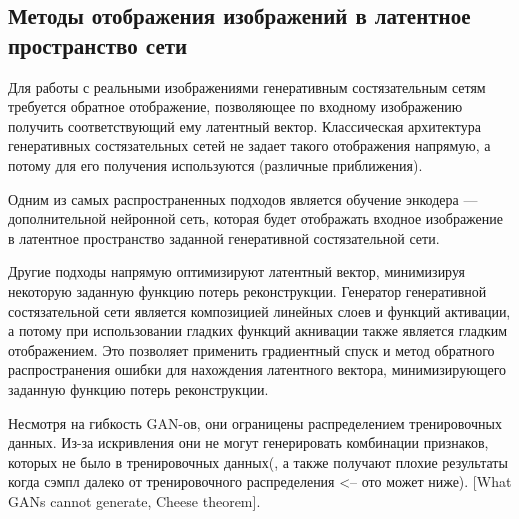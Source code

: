 \subsection{Методы отображения изображений в латентное пространство сети}
Для работы с реальными изображениями генеративным состязательным сетям требуется обратное отображение, позволяющее по входному изображению получить соответствующий ему латентный вектор. Классическая архитектура генеративных состязательных сетей не задает такого отображения напрямую, а потому для его получения используются (различные приближения).

Одним из самых распространенных подходов \cite{donahue2016adversarial} является обучение энкодера --- дополнительной нейронной сеть, которая будет отображать входное изображение в латентное пространство заданной генеративной состязательной сети. 

Другие подходы \cite{perarnau2016invertible} напрямую оптимизируют латентный вектор, минимизируя некоторую заданную функцию потерь реконструкции.
Генератор генеративной состязательной сети является композицией линейных слоев и функций активации, а потому при использовании гладких функций акнивации также является гладким отображением.
Это позволяет применить градиентный спуск и метод обратного распространения ошибки для нахождения латентного вектора, минимизирующего заданную функцию потерь реконструкции.


Несмотря на гибкость GAN-ов, они ограницены распределением тренировочных данных. Из-за искривления они не могут генерировать комбинации признаков, которых не было в тренировочных данных(, а также получают плохие результаты когда сэмпл далеко от тренировочного распределения <-- ото может ниже). [What GANs cannot generate, Cheese theorem]. 

